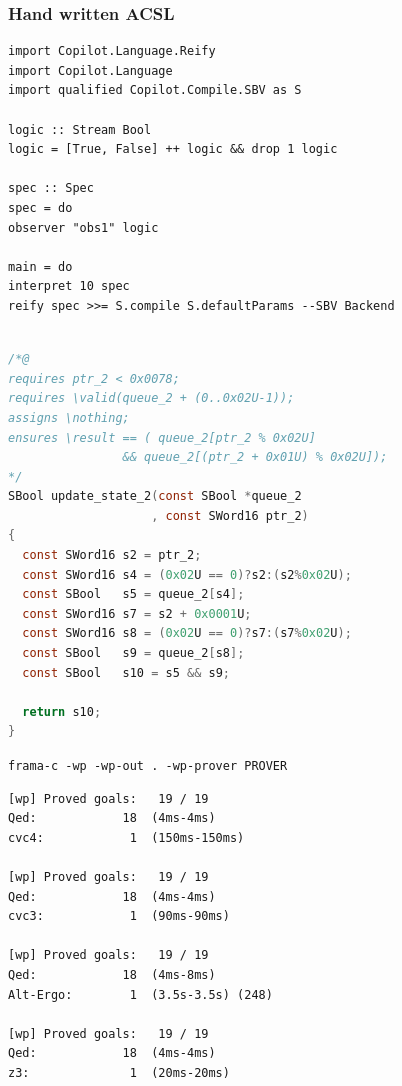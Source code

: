 \documentclass{beamer}
\begin{document}
  	
\begin{frame}[fragile]
\frametitle{Hand written ACSL}

\begin{verbatim}
import Copilot.Language.Reify
import Copilot.Language
import qualified Copilot.Compile.SBV as S
  	
logic :: Stream Bool
logic = [True, False] ++ logic && drop 1 logic
  	
spec :: Spec
spec = do
observer "obs1" logic
  	
main = do
interpret 10 spec
reify spec >>= S.compile S.defaultParams --SBV Backend
  	
\end{verbatim}
  	
\end{frame}
\begin{frame}[fragile]
	\scriptsize 
\begin{lstlisting}[language=C, keywordstyle=\color{blue}]
/*@
requires ptr_2 < 0x0078;
requires \valid(queue_2 + (0..0x02U-1));
assigns \nothing;
ensures \result == ( queue_2[ptr_2 % 0x02U] 
                && queue_2[(ptr_2 + 0x01U) % 0x02U]);
*/
SBool update_state_2(const SBool *queue_2
                    , const SWord16 ptr_2)
{
  const SWord16 s2 = ptr_2;
  const SWord16 s4 = (0x02U == 0)?s2:(s2%0x02U);
  const SBool   s5 = queue_2[s4];
  const SWord16 s7 = s2 + 0x0001U;
  const SWord16 s8 = (0x02U == 0)?s7:(s7%0x02U);
  const SBool   s9 = queue_2[s8];
  const SBool   s10 = s5 && s9;
  	
  return s10;
}
\end{lstlisting}


\end{frame}
\begin{frame}[fragile]
  	\texttt{frama-c -wp -wp-out . -wp-prover PROVER}
  	
\begin{lstlisting}[]
[wp] Proved goals:   19 / 19
Qed:            18  (4ms-4ms)
cvc4:            1  (150ms-150ms)

[wp] Proved goals:   19 / 19
Qed:            18  (4ms-4ms)
cvc3:            1  (90ms-90ms)
	
[wp] Proved goals:   19 / 19
Qed:            18  (4ms-8ms)
Alt-Ergo:        1  (3.5s-3.5s) (248)

[wp] Proved goals:   19 / 19
Qed:            18  (4ms-4ms)
z3:              1  (20ms-20ms)
\end{lstlisting}
  	
\end{frame}
\end{document}

